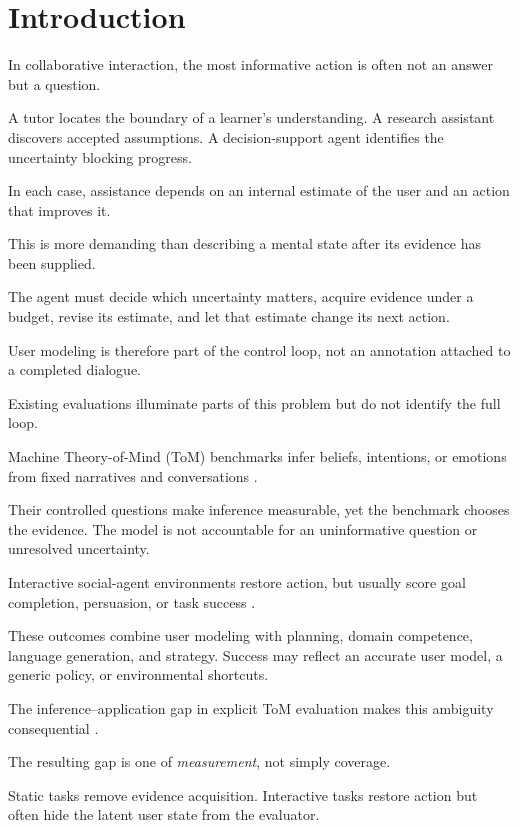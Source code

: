 \section{Introduction}

In collaborative interaction, the most informative action is often not an answer but a question.

A tutor locates the boundary of a learner's understanding. A research assistant discovers accepted
assumptions. A decision-support agent identifies the uncertainty blocking progress.

In each case, assistance depends on an internal estimate of the user and an action that improves it.

This is more demanding than describing a mental state after its evidence has been supplied.

The agent must decide which uncertainty matters, acquire evidence under a budget, revise its estimate,
and let that estimate change its next action.

User modeling is therefore part of the control loop, not an annotation attached to a completed dialogue.

Existing evaluations illuminate parts of this problem but do not identify the full loop.

Machine Theory-of-Mind (ToM) benchmarks infer beliefs, intentions, or emotions from fixed narratives
and conversations \citep{le2019revisiting,gandhi2023bigtom,kim2023fantom,xu2024opentom,chen2024tombench}.

Their controlled questions make inference measurable, yet the benchmark chooses the evidence. The model
is not accountable for an uninformative question or unresolved uncertainty.

Interactive social-agent environments restore action, but usually score goal completion, persuasion, or
task success \citep{zhou2024sotopia,mou2025agentsense,hwang2026infusing,wang2026tomelp,zhou2026tomswe}.

These outcomes combine user modeling with planning, domain competence, language generation, and
strategy. Success may reflect an accurate user model, a generic policy, or environmental shortcuts.

The inference--application gap in explicit ToM evaluation makes this ambiguity consequential
\citep{gu2024simpletom}.

The resulting gap is one of \emph{measurement}, not simply coverage.

Static tasks remove evidence acquisition. Interactive tasks restore action but often hide the latent
user state from the evaluator.


